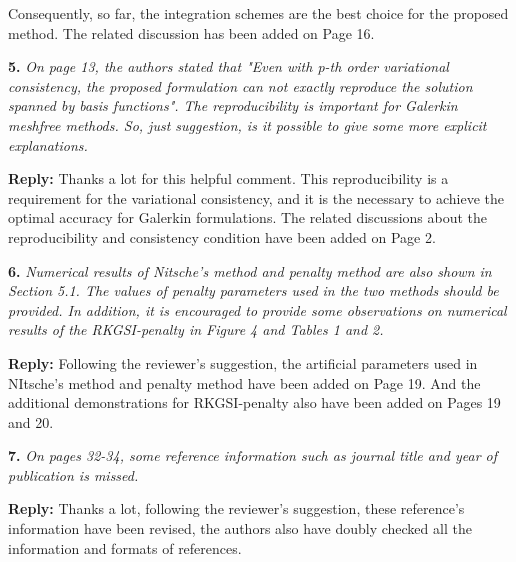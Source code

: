 \documentclass{article}
\begin{document}
Consequently, so far, the integration schemes are the best choice for the proposed method. The related discussion has been added on Page 16. 

\textbf{5.} \textit{On page 13, the authors stated that "Even with p-th order variational consistency, the proposed formulation can not exactly reproduce the solution spanned by basis functions". The reproducibility is important for Galerkin meshfree methods. So, just suggestion, is it possible to give some more explicit explanations.}

\textbf{Reply:} Thanks a lot for this helpful comment. This reproducibility is a requirement for the variational consistency, and it is the necessary to achieve the optimal accuracy for Galerkin formulations. The related discussions about the reproducibility and consistency condition have been added on Page 2.

\textbf{6.} \textit{Numerical results of Nitsche's method and penalty method are also shown in Section 5.1. The values of penalty parameters used in the two methods should be provided. In addition, it is encouraged to provide some observations on numerical results of the RKGSI-penalty in Figure 4 and Tables 1 and 2.}

\textbf{Reply:} Following the reviewer's suggestion, the artificial parameters used in NItsche's method and penalty method have been added on Page 19. And the additional demonstrations for RKGSI-penalty also have been added on Pages 19 and 20. 

\textbf{7.} \textit{On pages 32-34, some reference information such as journal title and year of publication is missed.}

\textbf{Reply:} Thanks a lot, following the reviewer's suggestion, these reference's information have been revised, the authors also have doubly checked all the information and formats of references.
\end{document}
